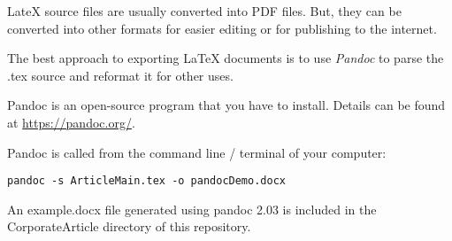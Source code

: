 LateX source files are usually converted into PDF files. But, they can be converted into other formats for easier editing or for publishing to the internet.

The best approach to exporting LaTeX documents is to use \emph{Pandoc} to parse the .tex source and reformat it for other uses.

Pandoc is an open-source program that you have to install. Details can be found at \href{https://pandoc.org/}{https://pandoc.org/}.

Pandoc is called from the command line / terminal of your computer:

\lstset{language = bash}
\begin{lstlisting}
pandoc -s ArticleMain.tex -o pandocDemo.docx
\end{lstlisting}


An example.docx file generated using pandoc 2.03 is included in the CorporateArticle directory of this repository.